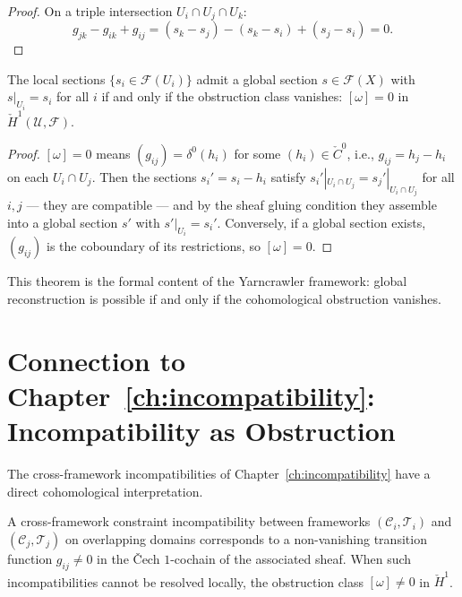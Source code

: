 \documentclass[11pt,openany]{book}
\begin{document}
\begin{proof}
On a triple intersection $U_i \cap U_j \cap U_k$:
\[
  g_{jk} - g_{ik} + g_{ij}
  = (s_k - s_j) - (s_k - s_i) + (s_j - s_i) = 0.
\]
\end{proof}

\begin{theorem}
\label{thm:obstruction-criterion}
The local sections $\{s_i \in \mathcal{F}(U_i)\}$ admit a
global section $s \in \mathcal{F}(X)$ with $s|_{U_i} = s_i$
for all $i$ if and only if the obstruction class vanishes:
$[\omega] = 0$ in $\check{H}^1(\mathcal{U}, \mathcal{F})$.
\end{theorem}

\begin{proof}
$[\omega] = 0$ means $(g_{ij}) = \delta^0(h_i)$ for some
$(h_i) \in \check{C}^0$, i.e., $g_{ij} = h_j - h_i$ on
each $U_i \cap U_j$.  Then the sections $s_i' = s_i - h_i$
satisfy $s_i'|_{U_i \cap U_j} = s_j'|_{U_i \cap U_j}$ for
all $i,j$ — they are compatible — and by the sheaf gluing
condition they assemble into a global section $s'$ with
$s'|_{U_i} = s_i'$.  Conversely, if a global section
exists, $(g_{ij})$ is the coboundary of its restrictions,
so $[\omega] = 0$.
\end{proof}

This theorem is the formal content of the Yarncrawler
framework: global reconstruction is possible if and only
if the cohomological obstruction vanishes.

\section{Connection to Chapter~\ref{ch:incompatibility}: Incompatibility as Obstruction}
\label{sec:incompatibility-connection}

The cross-framework incompatibilities of
Chapter~\ref{ch:incompatibility} have a direct
cohomological interpretation.

\begin{proposition}
\label{prop:incompatibility-obstruction}
A cross-framework constraint incompatibility between
frameworks $(\mathcal{C}_i, \mathcal{T}_i)$ and
$(\mathcal{C}_j, \mathcal{T}_j)$ on overlapping domains
corresponds to a non-vanishing transition function
$g_{ij} \neq 0$ in the Čech $1$-cochain of the associated
sheaf.  When such incompatibilities cannot be resolved
locally, the obstruction class $[\omega] \neq 0$ in
$\check{H}^1$.
\end{proposition}
\end{document}

